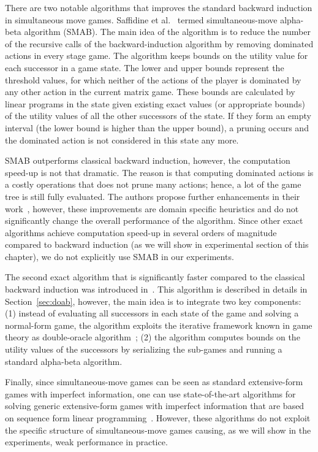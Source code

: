 There are two notable algorithms that improves the standard backward induction in simultaneous move games. 
Saffidine et al.~\cite{Saffidine12SMAB} termed simultaneous-move alpha-beta algorithm (SMAB). 
The main idea of the algorithm is to reduce the number of the recursive calls of the backward-induction algorithm by removing dominated actions in every stage game. The algorithm keeps bounds on the utility value for each successor in a game state. 
The lower and upper bounds represent the threshold values, for which neither of the actions of the player is dominated by any other action in the current matrix game. These bounds are calculated by linear programs in the state given existing exact values (or appropriate bounds) of the utility values of all the other successors of the state. If they form an empty interval (the lower bound is higher than the upper bound), a pruning occurs and the dominated action is not considered in this state any more. 

SMAB outperforms classical backward induction, however, the computation speed-up is not that dramatic. 
The reason is that computing dominated actions is a costly operations that does not prune many actions; hence, a lot of the game tree is still fully evaluated. The authors propose further enhancements in their work~\cite{Saffidine12SMAB}, however, these improvements are domain specific heuristics and do not significantly change the overall performance of the algorithm. Since other exact algorithms achieve computation speed-up in several orders of magnitude compared to backward induction (as we will show in experimental section of this chapter), we do not explicitly use SMAB in our experiments.

The second exact algorithm that is significantly faster compared to the classical backward induction was introduced in~\cite{Bosansky13Using}.
This algorithm is described in details in Section~\ref{sec:doab}, however, the main idea is to integrate two key components: (1) instead of evaluating all successors in each state of the game and solving a normal-form game, the algorithm exploits the iterative framework known in game theory as double-oracle algorithm~\cite{McMahan03Planning}; (2) the algorithm computes bounds on the utility values of the successors by serializing the sub-games and running a standard alpha-beta algorithm. 

Finally, since simultaneous-move games can be seen as standard extensive-form games with imperfect information, one can use state-of-the-art algorithms for solving generic extensive-form games with imperfect information that are based on sequence form linear programming~\cite{koller1996,bosansky2013-aamas}. However, these algorithms do not exploit the specific structure of simultaneous-move games causing, as we will show in the experiments, weak performance in practice.

